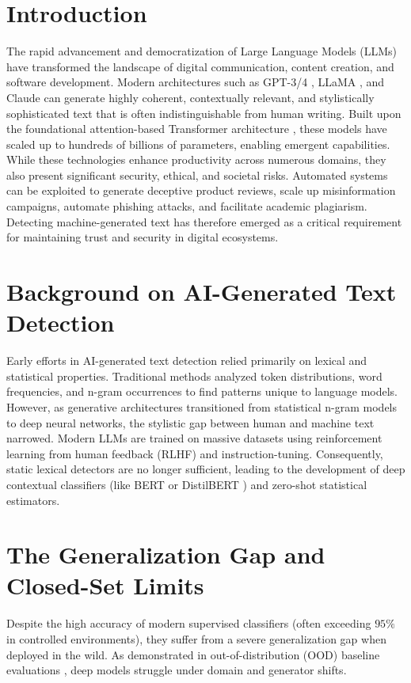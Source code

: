 \section{Introduction}\label{Chapter-1-Introduction}
\noindent The rapid advancement and democratization of Large Language Models (LLMs) have transformed the landscape of digital communication, content creation, and software development. Modern architectures such as GPT-3/4 \cite{brown2020language}, LLaMA \cite{touvron2023llama}, and Claude can generate highly coherent, contextually relevant, and stylistically sophisticated text that is often indistinguishable from human writing. Built upon the foundational attention-based Transformer architecture \cite{vaswani2017attention}, these models have scaled up to hundreds of billions of parameters, enabling emergent capabilities. While these technologies enhance productivity across numerous domains, they also present significant security, ethical, and societal risks. Automated systems can be exploited to generate deceptive product reviews, scale up misinformation campaigns, automate phishing attacks, and facilitate academic plagiarism. Detecting machine-generated text has therefore emerged as a critical requirement for maintaining trust and security in digital ecosystems.

\section{Background on AI-Generated Text Detection}\label{Chapter-1-Background}
\noindent Early efforts in AI-generated text detection relied primarily on lexical and statistical properties. Traditional methods analyzed token distributions, word frequencies, and n-gram occurrences to find patterns unique to language models. However, as generative architectures transitioned from statistical n-gram models to deep neural networks, the stylistic gap between human and machine text narrowed. Modern LLMs are trained on massive datasets using reinforcement learning from human feedback (RLHF) and instruction-tuning. Consequently, static lexical detectors are no longer sufficient, leading to the development of deep contextual classifiers (like BERT \cite{devlin2018bert} or DistilBERT \cite{sanh2019distilbert}) and zero-shot statistical estimators.

\section{The Generalization Gap and Closed-Set Limits}\label{Chapter-1-Generalization-Gap}
\noindent Despite the high accuracy of modern supervised classifiers (often exceeding $95\%$ in controlled environments), they suffer from a severe generalization gap when deployed in the wild. As demonstrated in out-of-distribution (OOD) baseline evaluations \cite{hendrycks2016baseline}, deep models struggle under domain and generator shifts. 

